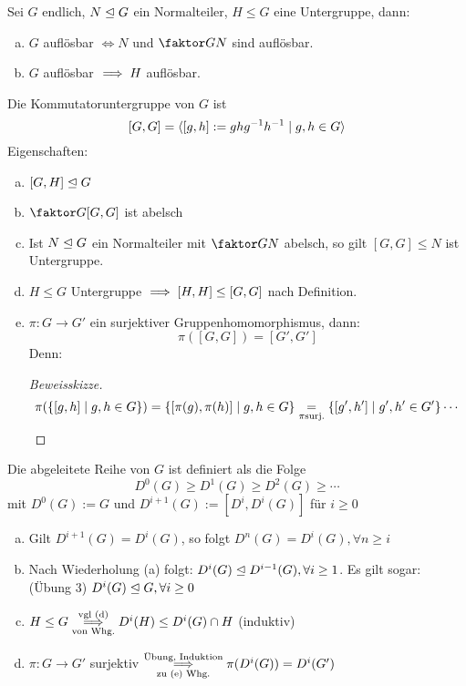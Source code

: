 \documentclass[a4paper]{report}
\begin{document}
\begin{prop}[übung]
  Sei $G$ endlich, $N \trianglelefteq G$ ein Normalteiler, $H \le G$ eine Untergruppe, dann:
  \begin{enumerate}[(a)]
    \item $G$ auflösbar $\iff N$ und $\fak GN$ sind auflösbar.
    \item $G$ auflösbar $\implies H$ auflösbar.
  \end{enumerate}
\begin{whg*}
  Die Kommutatoruntergruppe von $G$ ist
  \[[G,G] = \langle[g, h] := ghg^{-1}h^{-1}\mid g, h \in G\rangle\]
  Eigenschaften:
  \begin{enumerate} [(a)]
    \item $[G, H] \trianglelefteq G$
    \item $\fak G{[G,G]}$ ist abelsch
    \item Ist $N \trianglelefteq G$ ein Normalteiler mit $\fak GN$ abelsch, so gilt $[G, G] \le N$ ist Untergruppe.
    \item $H \le G$ Untergruppe $\implies [H, H] \le [G, G]$ nach Definition.
    \item $\pi : G \to G'$ ein surjektiver Gruppenhomomorphismus, dann: \[\pi([G, G]) = [G', G']\]
          Denn: \begin{proof}[Beweisskizze]
           \[\pi(\{[g, h] \mid g, h \in G\}) = \{[\pi(g), \pi(h)] \mid g, h \in G\} \underset{\pi \text{surj.}} = \{[g', h'] \mid g', h' \in G'\} \cdots \qedhere\]
          \end{proof}
  \end{enumerate}
\end{whg*}
\end{prop}
\begin{defi}
  Die abgeleitete Reihe von $G$ ist definiert als die Folge \[D^{0}(G) \ge D^{1}(G) \ge D^{2}(G) \ge \cdots\]
  mit $D^{0}(G) := G$ und $D^{i+1}(G) := [D^{i}, D^{i}(G)]$ für $i \ge 0$
\end{defi}
\begin{bem}\item
\begin{enumerate}[(a)]
  \item Gilt $D^{i+1}(G) = D^{i}(G)$, so folgt $D^{n}(G) = D^{i}(G), \forall n \ge i$
  \item Nach Wiederholung (a) folgt: $D^{i}(G) \trianglelefteq D^{i-1}(G), \forall i \ge 1$. Es gilt sogar: (Übung 3) $D^{i}(G) \trianglelefteq G, \forall i \ge 0$
  \item $H \le G \overunderset{\text{vgl (d)}}{\text{von Whg.}}\imp D^{i}(H) \le D^{i}(G) \cap H$ (induktiv)
    \item $\pi: G \to G'$ surjektiv $\overunderset{\text{Übung, Induktion}}{\text{zu (e) Whg.}} \imp  \pi(D^{i}(G)) = D^{i}(G')$
\end{enumerate}
\end{bem}
\end{document}
